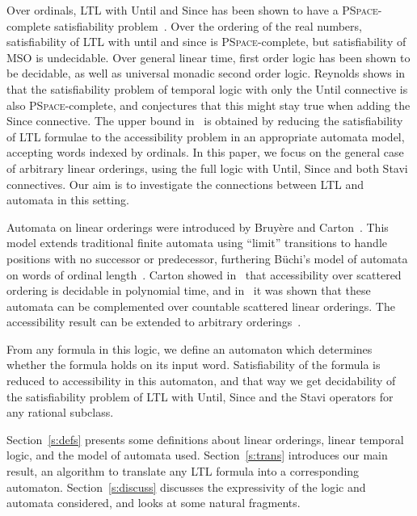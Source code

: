 \documentclass[envcountsame]{fsttcs-ps}
\newcommand{\until}{{Until}\xspace}
\newcommand{\since}{{Since}\xspace}
\newcommand{\pspace}{\textsc{PSpace}\xspace}
\begin{document}
Over ordinals, LTL with \until and \since has been shown to have a
\pspace-complete satisfiability problem~\cite{DBLP:conf/lpar/DemriR07}.  Over
the ordering of the real numbers, satisfiability of LTL with until and since
is \pspace-complete, but satisfiability of MSO is undecidable.  Over
general linear time, first order logic has been shown to be decidable, as well
as universal monadic second order logic.  Reynolds shows
in~\cite{DBLP:journals/jcss/Reynolds03} that the satisfiability problem of
temporal logic with only the \until connective is also \pspace-complete,
and conjectures that this might stay true when adding the \since
connective.  The upper bound in~\cite{DBLP:conf/lpar/DemriR07} is obtained by
reducing the satisfiability of LTL formulae to the accessibility problem in an
appropriate automata model, accepting words indexed by ordinals.
In this paper, we focus on the general case of arbitrary linear orderings,
using the full logic with \until, \since and both Stavi connectives.
Our aim is to investigate the connections between LTL and automata in this
setting.

Automata on linear orderings were introduced by Bruyère and
Carton~\cite{DBLP:conf/mfcs/BruyereC01}.  This model extends traditional finite
automata using ``limit'' transitions to handle positions with no successor
or predecessor, furthering Büchi's model of automata on words of ordinal
length~\cite{buchiordinals}.  Carton showed in~\cite{DBLP:conf/mfcs/Carton02}
that accessibility over scattered ordering is decidable in polynomial time,
and in~\cite{DBLP:journals/ijfcs/RispalC05} it was shown that these automata
can be complemented over countable scattered linear orderings.  The
accessibility result can be extended to arbitrary
orderings~\cite{cartonprcomm}.

From any formula in this logic, we define an automaton which determines
whether the formula holds on its input word.  Satisfiability of the formula is
reduced to accessibility in this automaton, and that way we get decidability
of the satisfiability problem of LTL with \until, \since and the Stavi
operators for any rational subclass.

Section~\ref{s:defs} presents some definitions about linear orderings, linear
temporal logic, and the model of automata used.
Section~\ref{s:trans} introduces our main result, an algorithm to translate
any LTL formula into a corresponding automaton.
Section~\ref{s:discuss} discusses the expressivity of the logic and automata
considered, and looks at some natural fragments.
\end{document}
